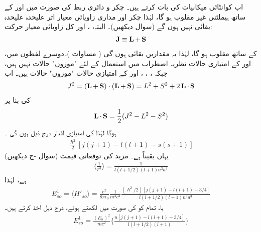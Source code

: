  اب کوانٹائی  میکانیات کی بات کرتے ہیں۔ چکر و دائری ربط کی صورت  میں  اور  کے ساتھ ہیملٹنی غیر مقلوب ہو گا،  لہٰذا چکر اور  مداری  زاویائی معیار اثر علیحدہ علیحدہ   بقائی  نہیں  ہوں گے   (سوال  دیکھیں)۔ البتہ،   ،  اور کل زاویائی معیار حرکت:
\begin{align}\label{مساوات_غیر_مضطرب_ایل_جمع_ایس_برابر_جے}
\operatorname{\mathbf{J}} \equiv \operatorname{\mathbf{L}} + \operatorname{\mathbf{S}}
\end{align}
کے ساتھ  مقلوب ہو گا،  لہٰذا   یہ مقداریں   بقائی  ہوں گی ( مساوات    )۔دوسرے لفظوں میں،   اور  کے امتیازی حالات نظریہ اضطراب میں استعمال کے لئے "موزوں" حالات نہیں ہیں،  جبکہ ، ، ، اور  کے امتیازی حالات  "موزوں" حالات ہیں۔ اب 
\begin{align*}
J^2 = (\operatorname{\mathbf{L}} + \operatorname{\mathbf{S}}) \cdot (\operatorname{\mathbf{L}} + \operatorname{\mathbf{S}}) = L^2 + S^2 + 2 \operatorname{\mathbf{L}} \cdot \operatorname{\mathbf{S}}
\end{align*}
کی بنا پر 
\begin{align}
\operatorname{\mathbf{L}} \cdot \operatorname{\mathbf{S}} = \frac{1}{2} (J^2 - L^2 - S^2)
\end{align}
ہوگا  لہٰذا    کی  امتیازی اقدار درج ذیل ہوں گی ۔
\begin{align*}
\frac{\hslash^2}{2} [j (j + 1) - l(l + 1) - s(s + 1)]
\end{align*}
یہاں یقیناً  ہے۔  مزید  کی توقعاتی قیمت  (سوال  -ج  دیکھیں) 
\begin{align}\label{مساوات_غیر_مضطرب_آر_تین}
\big\langle \frac{1}{r^3} \big\rangle = \frac{1}{l(l + 1/2) (l + 1) n^3 a^3} 
\end{align}
 ہے، لہٰذا   
\begin{align*}
E_{so}^1 = \langle H'_{so} \rangle = \frac{e^2}{8 \pi \epsilon_0} \frac{1}{m^2 c^2} \frac{(\hslash^2 /2) [j(j + 1) - l(l + 1) - 3/4]}{l(l + 1/2)(l + 1)n^3 a^3}
\end{align*} 
  یا، تمام  کو   کی صورت میں لکھتے ہوئے، درج ذیل اخذ کرتے ہیں۔ 
\begin{align}\label{مساوات_غیر_مضطرب_چکر_و_مدار_ربط}
E^1_{so} = \frac{(E_n)^2}{mc^2} \Big \{ \frac{n[j(j + 1) - l(l + 1) - 3/4]}{l(l + 1/2)(l + 1)} \Big \}
\end{align}

